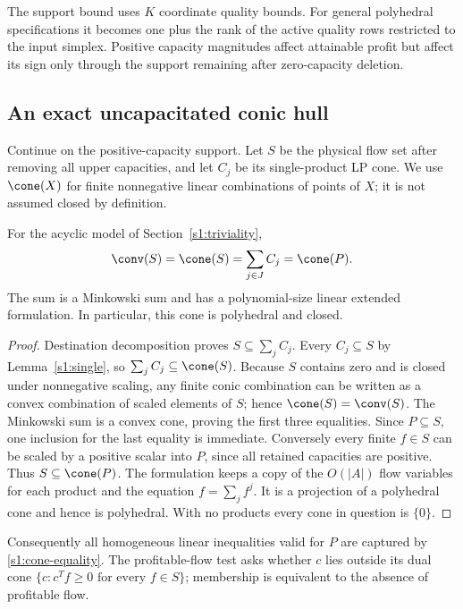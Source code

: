 The support bound uses $K$ coordinate quality bounds. For general
polyhedral specifications it becomes one plus the rank of the active
quality rows restricted to the input simplex. Positive capacity
magnitudes affect attainable profit but affect its sign only through
the support remaining after zero-capacity deletion.

\subsection{An exact uncapacitated conic hull}\label{s1:conic}

Continue on the positive-capacity support. Let $S$ be the physical flow
set after removing all upper capacities, and let $C_j$ be its
single-product LP cone. We use $\cone(X)$ for finite nonnegative linear
combinations of points of $X$; it is not assumed closed by definition.

\begin{theorem}\label{s1:cone-theorem}
For the acyclic model of Section~\ref{s1:triviality},
\begin{equation}
 \conv(S)=\cone(S)=\sum_{j\in J}C_j=\cone(P).\label{s1:cone-equality}
\end{equation}
The sum is a Minkowski sum and has a polynomial-size linear extended
formulation. In particular, this cone is polyhedral and closed.
\end{theorem}
\begin{proof}
Destination decomposition proves $S\subseteq\sum_jC_j$.
Every $C_j\subseteq S$ by Lemma~\ref{s1:single}, so
$\sum_jC_j\subseteq\cone(S)$. Because $S$ contains zero and is closed
under nonnegative scaling, any finite conic combination can be written
as a convex combination of scaled elements of $S$; hence
$\cone(S)=\conv(S)$. The Minkowski sum is a convex cone, proving the
first three equalities. Since $P\subseteq S$, one inclusion for the
last equality is immediate. Conversely every finite $f\in S$ can be
scaled by a positive scalar into $P$, since all retained capacities
are positive. Thus $S\subseteq\cone(P)$. The formulation keeps a copy
of the $O(|A|)$ flow variables for each product and the equation
$f=\sum_jf^j$. It is a projection of a polyhedral cone and hence is
polyhedral. With no products every cone in question is $\{0\}$.
\end{proof}

Consequently all homogeneous linear inequalities valid for $P$ are
captured by \eqref{s1:cone-equality}. The profitable-flow test asks whether
$c$ lies outside its dual cone
$\{c:c^Tf\ge0\text{ for every }f\in S\}$; membership is equivalent
to the absence of profitable flow.

